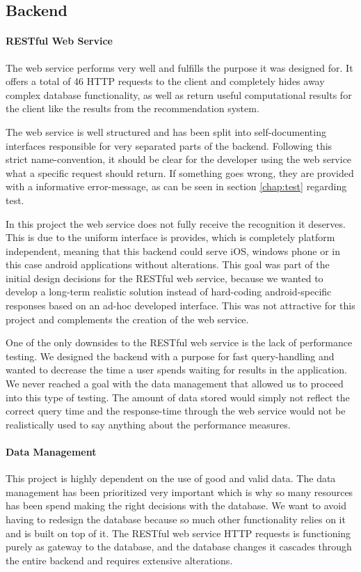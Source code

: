 \subsection{Backend}
\label{subsec:evalbackend}
\paragraph{RESTful Web Service}
The web service performs very well and fulfills the purpose it was designed for. It offers a total of 46 HTTP requests to the client and completely hides away complex database functionality, as well as return useful computational results for the client like the results from the recommendation system. 

The web service is well structured and has been split into self-documenting interfaces responsible for very separated parts of the backend. Following this strict name-convention, it should be clear for the developer using the web service what a specific request should return. If something goes wrong, they are provided with a informative error-message, as can be seen in section \ref{chap:test} regarding test. 

In this project the web service does not fully receive the recognition it deserves. This is due to the uniform interface is provides, which is completely platform independent, meaning that this backend could serve iOS, windows phone or in this case android applications without alterations. This goal was part of the initial design decisions for the RESTful web service, because we wanted to develop a long-term realistic solution instead of hard-coding android-specific responses based on an ad-hoc developed interface. This was not attractive for this project and complements the creation of the web service.

One of the only downsides to the RESTful web service is the lack of performance testing. We designed the backend with a purpose for fast query-handling and wanted to decrease the time a user spends waiting for results in the application. We never reached a goal with the data management that allowed us to proceed into this type of testing. The amount of data stored would simply not reflect the correct query time and the response-time through the web service would not be realistically used to say anything about the performance measures.

\paragraph{Data Management}
This project is highly dependent on the use of good and valid data. The data management has been prioritized very important which is why so many resources has been spend making the right decisions with the database. We want to avoid having to redesign the database because so much other functionality relies on it and is built on top of it. The RESTful web service HTTP requests is functioning purely as gateway to the database, and the database changes it cascades through the entire backend and requires extensive alterations. 

